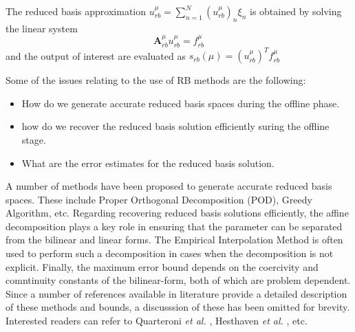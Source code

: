 \documentclass[11pt, oneside]{article}
\begin{document}
The reduced basis approximation $u_{rb}^{\mu} = \sum_{n=1}^{N}(u_{rb}^{\mu})_n \xi_n$ is obtained by solving the linear system
    \begin{equation}
      \mathbf{A}_{rb}^{\mu}u_{rb}^{\mu} = f_{rb}^{\mu}
    \end{equation}
and the output of interest are evaluated as $s_{rb}(\mu) = (u_{rb}^{\mu})^T f_{rb}^{\mu}$

Some of the issues relating to the use of RB methods are the following:
\begin{itemize}
  \item How do we generate accurate reduced basis spaces during the offline phase.
  \item how do we recover the reduced basis solution efficiently suring the offline stage.
  \item What are the error estimates for the reduced basis solution.
\end{itemize}

A number of methods have been proposed to generate accurate reduced basis spaces. These include Proper Orthogonal Decomposition (POD), Greedy Algorithm, etc. Regarding recovering reduced basis solutions efficiently, the affine decomposition plays a key role in ensuring that the parameter can be separated from the bilinear and linear forms. The Empirical Interpolation Method is often used to perform such a decomposition in cases when the decomposition is not explicit. Finally, the maximum error bound depends on the coercivity and comntinuity constants of the bilinear-form, both of which are problem dependent. Since a number of references available in literature provide a detailed description of these methods and bounds, a discusssion of these has been omitted for brevity. Interested readers can refer to Quarteroni \textit{et al.} \cite{quarteroni2017,quarteroni2011}, Hesthaven \textit{et al.} \cite{HesthavenRozzaStamm2015}, etc.
\end{document}
